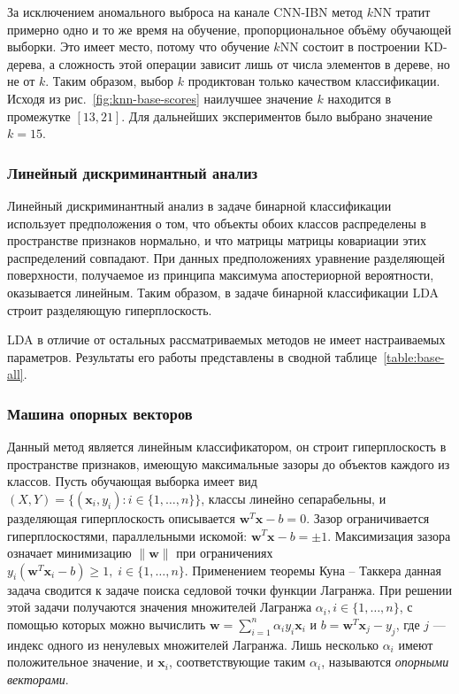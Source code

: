 За исключением аномального выброса на канале CNN-IBN метод \(k\)NN тратит примерно одно и то же время на обучение, пропорциональное объёму обучающей выборки. Это имеет место, потому что обучение \(k\)NN состоит в построении KD-дерева, а сложность этой операции зависит лишь от числа элементов в дереве, но не от \(k\). Таким образом, выбор \(k\) продиктован только качеством классификации. Исходя из рис.~\ref{fig:knn-base-scores} наилучшее значение \(k\) находится в промежутке \([13,21]\). Для дальнейших экспериментов было выбрано значение \(k=15\).

\subsubsection{Линейный дискриминантный анализ}
Линейный дискриминантный анализ в задаче бинарной классификации использует предположения о том, что объекты обоих классов распределены в пространстве признаков нормально, и что матрицы матрицы ковариации этих распределений совпадают. При данных предположениях уравнение разделяющей поверхности, получаемое из принципа максимума апостериорной вероятности, оказывается линейным. Таким образом, в задаче бинарной классификации LDA строит разделяющую гиперплоскость.

LDA в отличие от остальных рассматриваемых методов не имеет настраиваемых параметров. Результаты его работы представлены в сводной таблице~\ref{table:base-all}.

\subsubsection{Машина опорных векторов}
Данный метод является линейным классификатором, он строит гиперплоскость в пространстве признаков, имеющую максимальные зазоры до объектов каждого из классов. Пусть обучающая выборка имеет вид \(\left(X, Y\right)=\{\left(\mathbf{x}_i,y_i\right):i\in\{1,\dotsc,n\}\}\), классы линейно сепарабельны, и разделяющая гиперплоскость описывается \(\mathbf{w}^T\mathbf{x}-b=0\). Зазор ограничивается гиперплоскостями, параллельными искомой: \(\mathbf{w}^T\mathbf{x}-b=\pm1\). Максимизация зазора означает минимизацию \(\|\mathbf{w}\|\) при ограничениях \(y_i\left(\mathbf{w}^T\mathbf{x}_i-b\right)\geqslant1,\;i\in\{1,\dotsc,n\}\). Применением теоремы Куна -- Таккера данная задача сводится к задаче поиска седловой точки функции Лагранжа. При решении этой задачи получаются значения множителей Лагранжа \(\alpha_i, i\in\{1,\dotsc,n\}\), с помощью которых можно вычислить \(\mathbf{w}=\sum_{i=1}^n \alpha_i y_i\mathbf{x}_i\) и \(b=\mathbf{w}^T\mathbf{x}_j-y_j\), где \(j\) --- индекс одного из ненулевых множителей Лагранжа. Лишь несколько \(\alpha_i\) имеют положительное значение, и \(\mathbf{x}_i\), соответствующие таким \(\alpha_i\), называются \emph{опорными векторами}.

